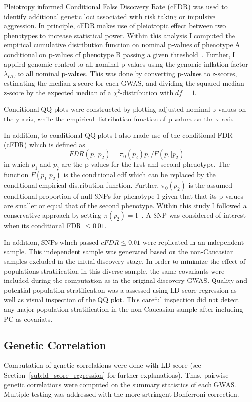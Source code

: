 Pleiotropy informed Conditional False Discovery Rate (cFDR) was used to identify additional genetic loci associated with risk taking or impulsive aggression. 
In principle, cFDR makes use of pleiotropic effect between two phenotypes to increase statistical power.
Within this analysis I computed the empirical cumulative distribution function on nominal p-values of phenotype A conditional on p-values of phenotype B passing a given threshold~\cite{Andreassen2013}.
Further, I applied genomic control to all nominal p-values using the genomic inflation factor $\lambda_{GC}$ to all nominal p-values.
This was done by converting p-values to z-scores, estimating the median z-score for each GWAS, and dividing the squared median z-score by the expected median of a $\chi^2$-distribution  with $df=1$.

Conditional QQ-plots were constructed by plotting adjusted nominal p-values on the y-axis, while the empirical distribution function of p-values on the x-axis.

In addition, to conditional QQ plots I also made use of the conditional FDR (cFDR) which is defined as~\cite{Andreassen2013}
\begin{equation}
  FDR(p_1|p_2)=\pi_0(p_2)p_1/F(p_1|p_2)
\end{equation}
in which $p_1$ and $p_2$ are the p-values for the first and second phenotype.
The function $F(p_1|p_2)$ is the conditional cdf which can be replaced by the conditional empirical distribution function.
Further, $\pi_0(p_2)$ is the assumed conditional proportion of null SNPs for phenotype 1 given that that its p-values are smaller or equal that of the second phenotype.
Within this study I followed a conservative approach by setting $\pi(p_2)=1$~\citet{Andreassen2013}.
A SNP was considered of interest when its conditional FDR $\leq 0.01$.

In addition, SNPs which passed $cFDR\leq 0.01$ were replicated in an independent sample.
This independent sample was generated based on the non-Caucasian samples excluded in the initial discovery stage.
In order to minimize the effect of populations stratification in this diverse sample, the same covariants were included during the computation as in the original discovery GWAS\@.
Quality and potential population stratification was a assessed using LD-score regression as well as visual inspection of the QQ plot.
This careful inspection did not detect any major population stratification in the non-Caucasian sample after including PC as covariats.

\subsection{Genetic Correlation}
\label{sub:genetic_correlation_ukb_assoc}

Computation of genetic correlations were done with LD-score (see Section~\ref{sub:ld_score_regression} for further explanations).
Thus, pairwise genetic correlations were computed on the summary statistics of each GWAS\@.
Multiple testing was addressed with the more srtringent Bonferroni correction.
